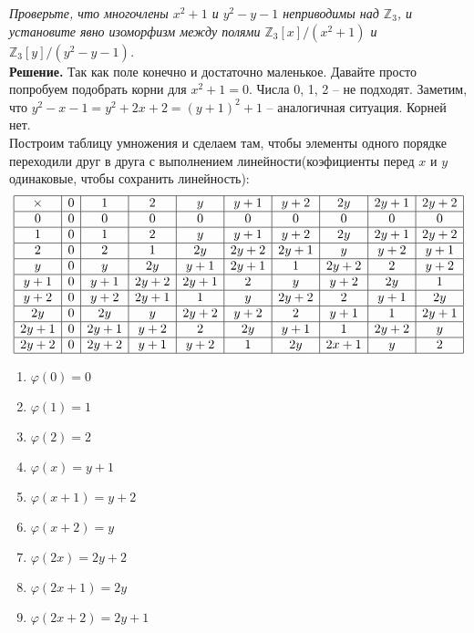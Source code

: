 \documentclass[a4paper, 10pt]{article}
\newcommand{\Z}{\mathbb{Z}}
\begin{document}
\begin{spacing}{1}
\begin{center}
\end{center}		
\noindent \textit{Проверьте, что многочлены $x^2 + 1$ и $y^2 - y - 1$ неприводимы над $\Z_3$, и установите явно изоморфизм между полями $\Z_3[x]/(x^2+1)$ и $\Z_3[y]/(y^2-y-1)$.
}\\
\noindent \textbf{Решение.} Так как поле конечно и достаточно маленькое. Давайте просто попробуем подобрать корни для $x^2 + 1 = 0$. Числа 0, 1, 2 -- не подходят.
Заметим, что $y^2 - x - 1 = y^2 + 2x + 2 = (y + 1)^2 + 1$ -- аналогичная ситуация. Корней нет. \\
Построим таблицу умножения и сделаем там, чтобы элементы одного порядке переходили друг в друга с выполнением линейности(коэфициенты перед $x$ и $y$ одинаковые, чтобы сохранить линейность):
$$
\begin{array}{|c|c|c|c|c|c|c|c|c|c|}
	\hline
	\times	& 0 & 1 & 2 & y & y + 1 & y + 2 & 2y & 2y + 1 & 2y + 2\\
	\hline
	0		& 0 & 0 & 0 & 0 & 0 & 0 & 0 & 0 & 0\\
	\hline
	1		& 0 & 1 & 2 & y & y + 1 & y + 2 & 2y & 2y + 1 & 2y + 2\\
	\hline
	2		& 0 & 2 & 1 & 2y & 2y + 2 & 2y + 1 & y & y + 2 & y + 1\\
	\hline
	y		& 0 & y & 2y & y + 1 & 2y + 1 & 1 & 2y+2 & 2 & y + 2\\
	\hline
	y + 1	& 0 & y + 1 & 2y + 2 & 2y + 1 & 2 & y & y + 2 & 2y & 1\\
	\hline
	y + 2	& 0 & y + 2 & 2y + 1 & 1 & y & 2y+2 & 2 & y + 1 & 2y\\
	\hline
	2y		& 0 & 2y & y & 2y+2 & y +2  & 2 & y+1 & 1 & 2y+1\\
	\hline
	2y + 1	& 0 & 2y + 1 & y + 2 & 2 & 2y & y+1 & 1 & 2y+2 & y\\
	\hline
	2y + 2	& 0 & 2y + 2 & y + 1 & y+2 & 1 & 2y & 2x + 1 & y & 2\\
	\hline
\end{array}
$$
\begin{enumerate}
	\item $\varphi(0) = 0$
	\item $\varphi(1) = 1$
	\item $\varphi(2) = 2$
	\item $\varphi(x) = y + 1$
	\item $\varphi(x + 1) = y + 2$
	\item $\varphi(x + 2) = y$
	\item $\varphi(2x) = 2y + 2$
	\item $\varphi(2x + 1) = 2y$
	\item $\varphi(2x + 2) = 2y + 1$
\end{enumerate}
		

\end{spacing}
\end{document}
